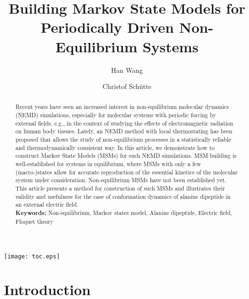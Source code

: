 \documentclass[journal=jctcce,manuscript=article]{achemso}
\title{Building Markov State Models for Periodically Driven Non-Equilibrium Systems}
\author{Han Wang}
\affiliation{CAEP Software Center for High Performance Numerical Simulation, Beijing, China}
\author{Christof Sch\"utte}
\affiliation{Institute for Mathematics, Freie Universit\"at Berlin, Germany}
\begin{document}
\begin{tocentry}
\texttt{[image: toc.eps]}
\end{tocentry}

\begin{abstract}
Recent years have seen an increased interest in non-equilibrium molecular dynamics (NEMD) simulations, especially for molecular systems with periodic forcing by external fields, e.g., in the context of studying the  effects of electromagnetic radiation on human body tissues. Lately, an NEMD method with local thermostating has been proposed that allows the study of 
non-equilibrium processes in a statistically reliable and thermodynamically consistent way. In this article, we demonstrate how to construct Markov State Models (MSMs) for such NEMD simulations. MSM building is well-established for systems in equilibrium, where MSMs with only a few (macro-)states allow for accurate reproduction of the essential kinetics of the molecular system under consideration. Non-equilibrium MSMs have not been established yet. This article presents a method for construction of such MSMs and illustrates their validity and usefulness for the case of conformation dynamics of alanine dipeptide in an external electric field.  \\
\textbf{Keywords:} {Non-equilibrium, Markov states model, Alanine dipeptide, Electric field, Floquet theory}
\end{abstract}


\maketitle

\section{Introduction}
\end{document}
